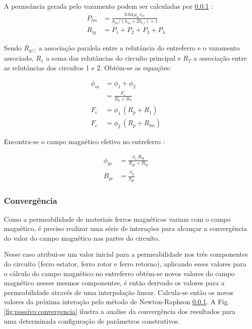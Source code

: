 A permeância gerada pelo vazamento podem ser calculadas por \ref{}  :
\begin{align}
	P_{lm} &= \frac{0.64 \,  \mu_0 \,r_{ee}}{h_m/(h_m+2h_{ef})+1} \\
	R_{lg} &= P_1 + P_2 + P_3 + P_4	
\end{align} 

Sendo $R_{g//}$ a associação paralela entre a relutância do entreferro e o vazamento associado, $R_1$ a soma das relutâncias do circuíto principal e $R_T$ a associação entre as relutâncias dos circuítos 1 e 2. Obtém-se as equações:

\begin{align}
	\phi_m &= \phi_1 + \phi_2 \\
		   &= \frac{F_c}{R_p + R_T} \\
	F_c	   &= \phi_1 \, (R_p + R_1) \\
	F_c    &= \phi_2 \, (R_p + R_{lm})
\end{align}

Encontra-se o campo magnético efetivo no entreferro :

\begin{align}
   \phi_{ge} &= \frac{\phi_1 \, R_{lg}}{R_{ge}+R_{lg}} \\
   B_{ge} &= \frac{\phi_g}{S_{ge}}
\end{align}

\subsubsection{Convergência}

Como a permeabilidade de materiais ferros magnéticos variam com o campo magnético, é preciso realizar uma série de interações para alcançar a convergência do valor do campo magnético nas partes do circuíto. 

Nesse caso atribui-se um valor inicial para a permeabilidade nos três componentes do circuíto (ferro estator, ferro rotor e ferro retorno), aplicando esses valores para o cálculo do campo magnético no entreferro obtém-se novos valores do campo magnético nesses mesmos componentes, é então derivado os valores para a permeabilidade através de uma interpolação linear. Calcula-se então os novos valores da próxima interação pelo método de Newton-Raphson \ref{}. A Fig. \ref{fig:passivo:convergencia} ilustra a analise da convergência dos resultados para uma determinada configuração de parâmetros construtivos.  



